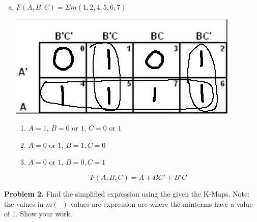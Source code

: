 \documentclass[11pt]{article}
\begin{document}
\begin{enumerate}[a)]
    \item
    $F(A, B, C) = \Sigma m(1,2,4,5,6,7)$
    \vspace{-15pt}\begin{center}
        \includegraphics[scale=0.35]{1c.png}
    \end{center}
    \vspace{-20pt}\begin{enumerate}[$\bullet$]
        \item $A=1,\,B = 0$ or $1,\,C=0$ or $1$
        \item \vspace{-5pt}$A=0$ or $1,\,B=1,C=0$
        \item \vspace{-5pt}$A=0$ or $1,\,B=0,C=1$
    \end{enumerate}
    $$F(A,B,C) = A + BC' + B'C$$
\end{enumerate}

\pagebreak


\textbf{Problem 2.} Find the simplified expression using the given the K-Maps. Note: the 
values in $m(\,\,\,)$ values are expression are where the minterms have a value of 1. 
Show your work.
\end{document}
